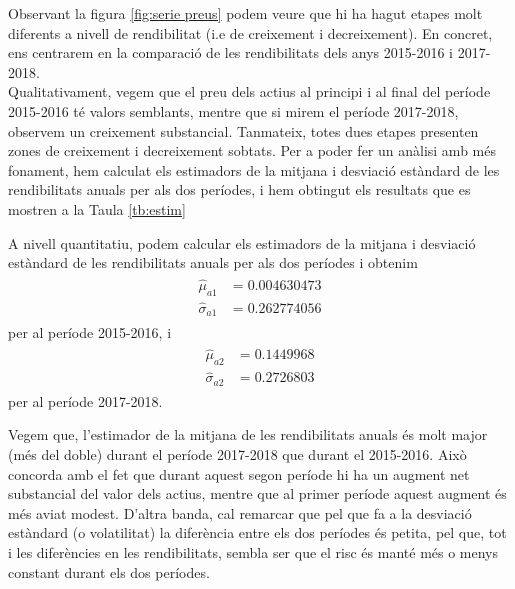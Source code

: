 \documentclass{article}
\numberwithin{table}{section}
\numberwithin{figure}{section}
\numberwithin{equation}{section}
\begin{document}
Observant la figura \ref{fig:serie preus} podem veure que hi ha hagut etapes molt diferents a nivell de rendibilitat (i.e de creixement i decreixement). En concret, ens centrarem en la comparació de les rendibilitats dels anys 2015-2016 i 2017-2018.\\
Qualitativament, vegem que el preu dels actius al principi i al final del període 2015-2016 té valors semblants, mentre que si mirem el període 2017-2018, observem un creixement substancial. Tanmateix, totes dues etapes presenten zones de creixement i decreixement sobtats. Per a poder fer un anàlisi amb més fonament, hem calculat els estimadors de la  mitjana i desviació estàndard de les rendibilitats anuals per als dos períodes, i hem obtingut els resultats que es mostren a la Taula \ref{tb:estim}


A nivell quantitatiu, podem calcular els estimadors de la  mitjana i  desviació estàndard de les rendibilitats anuals per als dos períodes i obtenim
\begin{align}
  \begin{split}
  \hat{\mu}_{a1} &= 0.004630473 \\
\hat{\sigma}_{a1}&=0.262774056
  \end{split}
\end{align}
  per al període 2015-2016, i
\begin{align}
  \begin{split}
  \hat{\mu}_{a2} &= 0.1449968 \\
\hat{\sigma}_{a2}&= 0.2726803
  \end{split}
\end{align}
per al període 2017-2018.

Vegem que, l'estimador de la mitjana de les rendibilitats anuals és molt major (més del doble) durant el període 2017-2018 que durant el 2015-2016. Això concorda amb el fet que durant aquest segon període hi ha un augment net substancial del valor dels actius, mentre que al primer període aquest augment és més aviat modest. D'altra banda, cal remarcar que pel que fa a la desviació estàndard (o volatilitat) la diferència entre els dos períodes és petita, pel que, tot i les diferències en les rendibilitats, sembla ser que el risc és manté més o menys constant durant els dos períodes.





\end{document}
